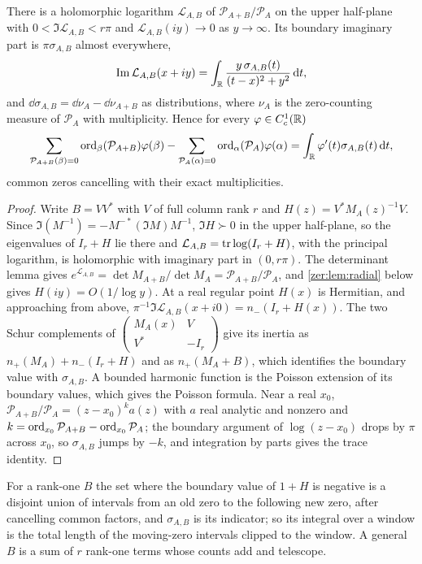 \begin{theorem}\label{zer:thm:shift}
There is a holomorphic logarithm $\mathcal L_{A,B}$ of $\mathcal P_{A+B}/\mathcal P_A$ on the upper
half-plane with $0<\Im\mathcal L_{A,B}<r\pi$ and $\mathcal L_{A,B}(iy)\to0$ as $y\to\infty$. Its boundary
imaginary part is $\pi\sigma_{A,B}$ almost everywhere,
\[
 \operatorname{Im}\mathcal L_{A,B}(x+iy)=\int_{\mathbb{R}}\frac{y\,\sigma_{A,B}(t)}{(t-x)^2+y^2}\,\mathrm{d} t,
\]
and $\dd\sigma_{A,B}=\dd\nu_A-\dd\nu_{A+B}$ as distributions, where $\nu_A$ is the zero-counting measure
of $\mathcal P_A$ with multiplicity. Hence for every $\varphi\in C^1_c(\mathbb{R})$
\[
 \sum_{\mathcal P_{A+B}(\beta)=0}\operatorname{ord}_\beta(\mathcal P_{A+B})\varphi(\beta)-\sum_{\mathcal P_A(\alpha)=0}\operatorname{ord}_\alpha(\mathcal P_A)\varphi(\alpha)
 =\int_{\mathbb{R}}\varphi'(t)\sigma_{A,B}(t)\,\mathrm{d} t,
\]
common zeros cancelling with their exact multiplicities.
\end{theorem}
\begin{proof}
Write $B=VV^*$ with $V$ of full column rank $r$ and $H(z)=V^*M_A(z)^{-1}V$. Since
$\Im(M^{-1})=-M^{-*}(\Im M)M^{-1}$, $\Im H\succ0$ in the upper half-plane, so the eigenvalues of
$I_r+H$ lie there and $\mathcal L_{A,B}=\operatorname{tr}\log(I_r+H)$, with the principal logarithm, is holomorphic
with imaginary part in $(0,r\pi)$. The determinant lemma gives
$e^{\mathcal L_{A,B}}=\det M_{A+B}/\det M_A=\mathcal P_{A+B}/\mathcal P_A$, and \cref{zer:lem:radial} below gives
$H(iy)=O(1/\log y)$. At a real regular point $H(x)$ is Hermitian, and approaching from above,
$\pi^{-1}\Im\mathcal L_{A,B}(x+i0)=n_-(I_r+H(x))$. The two Schur complements of
$\begin{pmatrix}M_A(x)&V\\V^*&-I_r\end{pmatrix}$ give its inertia as $n_+(M_A)+n_-(I_r+H)$ and as
$n_+(M_A+B)$, which identifies the boundary value with $\sigma_{A,B}$. A bounded harmonic function is
the Poisson extension of its boundary values, which gives the Poisson formula. Near a real $x_0$,
$\mathcal P_{A+B}/\mathcal P_A=(z-x_0)^ka(z)$ with $a$ real analytic and nonzero and
$k=\operatorname{ord}_{x_0}\mathcal P_{A+B}-\operatorname{ord}_{x_0}\mathcal P_A$; the boundary argument of $\log(z-x_0)$ drops by
$\pi$ across $x_0$, so $\sigma_{A,B}$ jumps by $-k$, and integration by parts gives the trace identity.
\end{proof}

For a rank-one $B$ the set where the boundary value of $1+H$ is negative is a disjoint union of
intervals from an old zero to the following new zero, after cancelling common factors, and
$\sigma_{A,B}$ is its indicator; so its integral over a window is the total length of the moving-zero
intervals clipped to the window. A general $B$ is a sum of $r$ rank-one terms whose counts add and
telescope.

